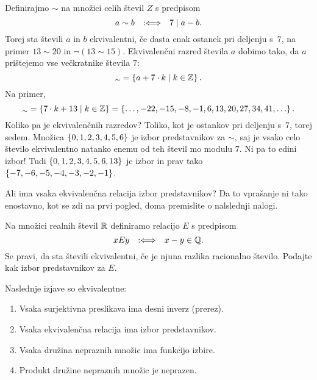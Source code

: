 \begin{primer}
  Definirajmo $\sim$ na množici celih števil $Z$ s predpisom
  \begin{equation*}
    a \sim b \quad {{:}{\Longleftrightarrow}}\quad 7 \mathrel{|} a - b.
  \end{equation*}
  Torej sta števili $a$ in $b$ ekvivalentni, če dasta enak ostanek pri deljenju s~$7$,
  na primer $13 \sim 20$ in $\lnot (13 \sim 15)$.
  Ekvivalenčni razred števila $a$ dobimo tako, da $a$ prištejemo vse večkratnike števila $7$:
  \begin{equation*}
    [a]_{\sim} = \set{ a + 7 \cdot k \such k \in \ZZ }.
  \end{equation*}
  Na primer,
  \begin{equation*}
    [13]_\sim = \set{ 7 \cdot k + 13 \such k \in \ZZ }
           = \set{ \ldots, -22, -15, -8, -1, 6, 13, 20, 27, 34, 41, \ldots}.
  \end{equation*}
  Koliko pa je ekvivalenčnih razredov? Toliko, kot je ostankov pri deljenju s~$7$, torej sedem. Množica
  $\left\{0, 1, 2, 3, 4, 5, 6\right\}$ je izbor predstavnikov za $\sim$, saj je vsako celo število ekvivalentno natanko enemu od
  teh števil mo modulu $7$.
  Ni pa to edini izbor! Tudi $\left\{0, 1, 2, 3, 4, 5, 6, 13\right\}$ je izbor in prav tako $\left\{-7, -6, -5, -4, -3, -2, -1\right\}$.
\end{primer}

Ali ima vsaka ekvivalenčna relacija izbor predstavnikov? Da to vprašanje ni tako
enostavno, kot se zdi na prvi pogled, doma premislite o nalslednji nalogi.

\begin{naloga}
  Na množici realnih števil $\mathbb{R}$ definiramo relacijo $E$ s predpisom
  \begin{equation*}
    x E y  \quad {{:}{\Longleftrightarrow}}\quad  x - y \in \mathbb{Q}.
  \end{equation*}
  Se pravi, da sta števili ekvivalentni, če je njuna razlika racionalno število. Podajte kak
  izbor predstavnikov za $E$.
\end{naloga}

\begin{izrek}
  Naslednje izjave so ekvivalentne:
  \begin{enumerate}
  \item Vsaka surjektivna preslikava ima desni inverz (prerez).
  \item Vsaka ekvivalenčna relacija ima izbor predstavnikov.
  \item Vsaka družina nepraznih množic ima funkcijo izbire.
  \item Produkt družine nepraznih množic je neprazen.
  \end{enumerate}
\end{izrek}


